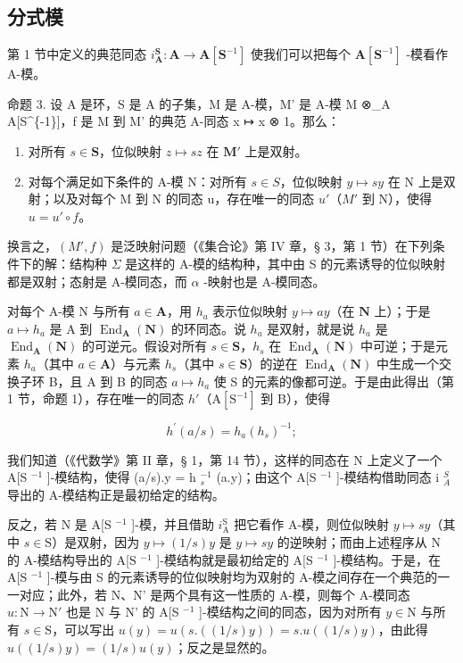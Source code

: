 \subsection{分式模}

第 1 节中定义的典范同态 \(i_{\mathbf{A}}^{\mathbf{S}} \colon \mathbf{A} \to \mathbf{A}[\mathbf{S}^{-1}]\) 使我们可以把每个 \(\mathbf{A}[\mathbf{S}^{-1}]\) -模看作 A-模。

命题 3. 设 A 是环，S 是 A 的子集，M 是 A-模，M' 是 A-模 M ⊗\_A A{[}S\^{}\{-1\}{]}，f 是 M 到 M' 的典范 A-同态 x ↦ x ⊗ 1。那么：

\begin{enumerate}
\def\labelenumi{(\arabic{enumi})}
\item
  对所有 \(s \in \mathbf{S}\)，位似映射 \(z \mapsto sz\) 在 \(\mathbf{M}'\) 上是双射。
\item
  对每个满足如下条件的 A-模 N：对所有 \(s \in S\)，位似映射 \(y \mapsto sy\) 在 N 上是双射；以及对每个 M 到 N 的同态 u，存在唯一的同态 \(u'\)（\(M'\) 到 N），使得 \(u = u' \circ f\)。
\end{enumerate}

换言之，\((M',f)\) 是泛映射问题（《集合论》第 IV 章，§ 3，第 1 节）在下列条件下的解：结构种 \(\Sigma\) 是这样的 A-模的结构种，其中由 S 的元素诱导的位似映射都是双射；态射是 A-模同态，而 \(\alpha\) -映射也是 A-模同态。

对每个 A-模 N 与所有 \(a \in \mathbf{A}\)，用 \(h_a\) 表示位似映射 \(y \mapsto ay\)（在 \(\mathbf{N}\) 上）；于是 \(a \mapsto h_a\) 是 A 到 \(\operatorname{End}_{\mathbf{A}}(\mathbf{N})\) 的环同态。说 \(h_a\) 是双射，就是说 \(h_a\) 是 \(\operatorname{End}_{\mathbf{A}}(\mathbf{N})\) 的可逆元。假设对所有 \(s \in \mathbf{S}\)，\(h_s\) 在 \(\operatorname{End}_{\mathbf{A}}(\mathbf{N})\) 中可逆；于是元素 \(h_a\)（其中 \(a \in \mathbf{A}\)）与元素 \(h_s\)（其中 \(s \in \mathbf{S}\)）的逆在 \(\operatorname{End}_{\mathbf{A}}(\mathbf{N})\) 中生成一个交换子环 B，且 A 到 B 的同态 \(a \mapsto h_a\) 使 S 的元素的像都可逆。于是由此得出（第 1 节，命题 1），存在唯一的同态 \(h'\)（\(\mathrm{A}[\mathrm{S}^{-1}]\) 到 B），使得

\[
h ^ {\prime} (a / s) = h _ {a} \left(h _ {s}\right) ^ {- 1};
\]

我们知道（《代数学》第 II 章，§ 1，第 14 节），这样的同态在 N 上定义了一个 A{[}S \(^{-1}\) {]}-模结构，使得 (a/s).y = h \(_{s}^{-1}\) (a.y)；由这个 A{[}S \(^{-1}\) {]}-模结构借助同态 i \(_{A}^{S}\) 导出的 A-模结构正是最初给定的结构。

反之，若 N 是 A{[}S \(^{-1}\) {]}-模，并且借助 \(i_{\text{A}}^{\text{S}}\) 把它看作 A-模，则位似映射 \(y \mapsto sy\)（其中 \(s \in \text{S}\)）是双射，因为 \(y \mapsto (1/s)y\) 是 \(y \mapsto sy\) 的逆映射；而由上述程序从 N 的 A-模结构导出的 A{[}S \(^{-1}\) {]}-模结构就是最初给定的 A{[}S \(^{-1}\) {]}-模结构。于是，在 A{[}S \(^{-1}\) {]}-模与由 S 的元素诱导的位似映射均为双射的 A-模之间存在一个典范的一一对应；此外，若 N、N' 是两个具有这一性质的 A-模，则每个 A-模同态 \(u: \text{N} \to \text{N}'\) 也是 N 与 N' 的 A{[}S \(^{-1}\) {]}-模结构之间的同态，因为对所有 \(y \in \text{N}\) 与所有 \(s \in \text{S}\)，可以写出 \(u(y) = u(s. ((1/s)y)) = s.u((1/s)y)\)，由此得 \(u((1/s)y) = (1/s)u(y)\)；反之是显然的。

